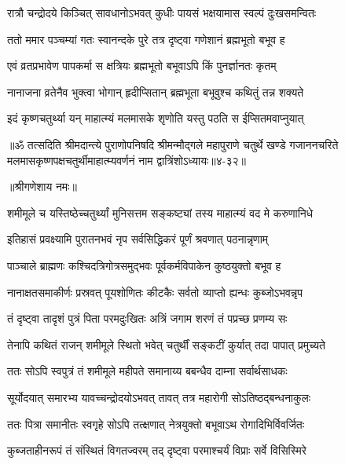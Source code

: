 \twolineshloka
{रात्रौ चन्द्रोदये किञ्चित् सावधानोऽभवत् कुधीः}
{पायसं भक्षयामास स्वल्पं दुःखसमन्वितः} %

\twolineshloka
{ततो ममार पञ्चम्यां गतः स्वानन्दके पुरे}
{तत्र दृष्ट्वा गणेशानं ब्रह्मभूतो बभूव ह} %

\twolineshloka
{एवं व्रतप्रभावेण पापकर्मा स क्षत्रियः}
{ब्रह्मभूतो बभूवाऽपि किं पुनर्ज्ञानतः कृतम्} %

\twolineshloka
{नानाजना व्रतेनैव भुक्त्वा भोगान् हृदीप्सितान्}
{ब्रह्मभूता बभूवुश्च कथितुं तन्न शक्यते} %

\twolineshloka
{इदं कृष्णचतुर्थ्या यन् माहात्म्यं मलमासके}
{श‍ृणोति यस्तु पठति स ईप्सितमवाप्नुयात्} %

॥ॐ तत्सदिति श्रीमदान्त्ये पुराणोपनिषदि श्रीमन्मौद्गले महापुराणे चतुर्थे खण्डे गजाननचरिते मलमासकृष्णपक्षचतुर्थीमाहात्म्यवर्णनं नाम द्वात्रिंशोऽध्यायः॥४-३२॥


\label{sec:shami-mula-chaturthi-vratacharana-varnanam}

\centerline{॥श्रीगणेशाय नमः॥}


\twolineshloka
{शमीमूले च यस्तिष्ठेच्चतुर्थ्यां मुनिसत्तम}
{सङ्कष्ट्यां तस्य माहात्म्यं वद मे करुणानिधे} %


\twolineshloka
{इतिहासं प्रवक्ष्यामि पुरातनभवं नृप}
{सर्वसिद्धिकरं पूर्णं श्रवणात् पठनान्नृणाम्} %

\twolineshloka
{पाञ्चाले ब्राह्मणः कश्चिदत्रिगोत्रसमुद्भवः}
{पूर्वकर्मविपाकेन कुष्ठयुक्तो बभूव ह} %

\twolineshloka
{नानाक्षतसमाकीर्णः प्रस्रवत् पूयशोणितः}
{कीटकैः सर्वतो व्याप्तो ह्यन्धः कुब्जोऽभवन्नृप} %

\twolineshloka
{तं दृष्ट्वा तादृशं पुत्रं पिता परमदुःखितः}
{अत्रिं जगाम शरणं तं पप्रच्छ प्रणम्य सः} %

\twolineshloka
{तेनापि कथितं राजन् शमीमूले स्थितो भवेत्}
{चतुर्थीं सङ्कटीं कुर्यात् तदा पापात् प्रमुच्यते} %

\twolineshloka
{ततः सोऽपि स्वपुत्रं तं शमीमूले महीपते}
{समानाय्य बबन्धैव दाम्ना सर्वार्थसाधकः} %

\twolineshloka
{सूर्योदयात् समारभ्य यावच्चन्द्रोदयोऽभवत्}
{तावत् तत्र महारोगी सोऽतिष्ठद्बन्धनाकुलः} %

\twolineshloka
{ततः पित्रा समानीतः स्वगृहे सोऽपि तत्क्षणात्}
{नेत्रयुक्तो बभूवाऽथ रोगादिभिर्विवर्जितः} %

\twolineshloka
{कुब्जताहीनरूपं तं संस्थितं विगतज्वरम्}
{तद् दृष्ट्वा परमाश्चर्यं विप्राः सर्वे विसिस्मिरे} %

